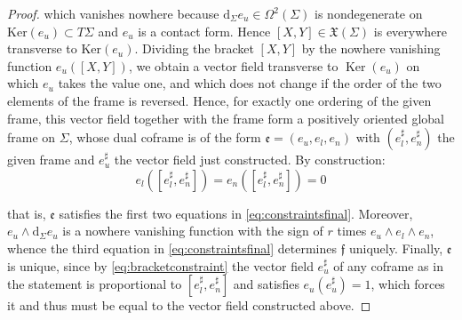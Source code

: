 \documentclass[10pt,reqno,a4paper]{amsart}
\theoremstyle{plain}
\theoremstyle{definition}
\theoremstyle{remark}
\theoremstyle{remark}
\def\dd{\mathrm{d}}
\def\fre{\mathfrak{e}}
\newcommand{\Ker}{\operatorname{Ker}}
\renewcommand{\(}{ (}
\renewcommand{\)}{ )}
\newcommand{\frf}{\mathfrak{f}}
\begin{document}
\begin{proof}
\noindent
which vanishes nowhere because $\dd _\Sigma e_u\in \Omega^2(\Sigma)$ is nondegenerate on $\mathrm{Ker}(e_u)\subset T\Sigma$ and $e_u$ is a contact form. Hence $[X, Y]\in \mathfrak{X}(\Sigma)$ is everywhere transverse to $\mathrm{Ker}(e_u)$. Dividing the bracket $[X, Y]$ by the nowhere vanishing function $e_u([X, Y])$, we obtain a vector field transverse to $\Ker(e_u)$ on which $e_u$ takes the value one, and which does not change if the order of the two elements of the frame is reversed. Hence, for exactly one ordering of the given frame, this vector field together with the frame form a positively oriented global frame on $\Sigma$, whose dual coframe is of the form $\fre = (e_u,e_l,e_n)$ with $(e^{\sharp}_{l},e^{\sharp}_{n})$ the given frame and $e^{\sharp}_{u}$ the vector field just constructed. By construction: 
\begin{equation*}
e_l([e^{\sharp}_{l},e^{\sharp}_{n}]) = e_n([e^{\sharp}_{l},e^{\sharp}_{n}]) = 0    
\end{equation*}

\noindent
that is, $\fre$ satisfies the first two equations in  \eqref{eq:constraintsfinal}. Moreover, $e_u\wedge \dd_{\Sigma} e_u$ is a nowhere vanishing function with the sign of $r$ times $e_u\wedge e_l\wedge e_n$, whence the third equation in \eqref{eq:constraintsfinal} determines $\frf$ uniquely. Finally, $\fre$ is unique, since by \eqref{eq:bracketconstraint} the vector field $e^{\sharp}_{u}$ of any coframe as in the statement is proportional to $[e^{\sharp}_{l},e^{\sharp}_{n}]$ and satisfies $e_u(e^{\sharp}_{u}) = 1$, which forces it and thus must be equal to the vector field constructed above. \medskip


\end{proof}
\end{document}
